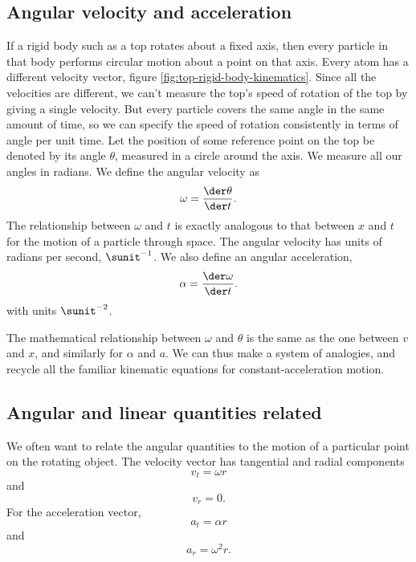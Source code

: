 

\subsection{Angular velocity and acceleration}
If a rigid body such as a top rotates about a fixed axis, then every particle in that body
performs circular motion about a point on that axis.
Every atom has a different velocity
vector, figure \ref{fig:top-rigid-body-kinematics}. Since all the velocities are different, we
can't measure the top's speed of rotation of the top by giving a
single velocity.
But every particle covers the same angle in the same
amount of time, so we can specify the speed of
rotation consistently in terms of angle per unit time. Let
the position of some reference point on the top be denoted
by its angle $\theta$, measured in a circle around the axis. We measure
all our angles in radians.  We define the angular velocity as
\begin{equation*}
        \omega        =          \frac{\der\theta}{\der t} .
\end{equation*}
The relationship between $\omega$ and $t$ is
exactly analogous to that between $x$ and $t$ for the motion of
a particle through space.
The angular velocity has units of radians per second, $\sunit^{-1}$.
We also define an
angular acceleration,
\begin{equation*}
        \alpha        =          \frac{\der\omega}{\der t}.
\end{equation*}
with units $\sunit^{-2}$.

The mathematical relationship between $\omega$ and $\theta$ is the same as
the one between $v$ and $x$, and similarly for $\alpha$ and $a$. We can
thus make a system of analogies, and recycle all
the familiar kinematic equations for constant-acceleration
motion.


\subsection{Angular and linear quantities related}
We often want to relate the angular
quantities to the motion of a particular point on the rotating
object.
The velocity vector has tangential and radial components
\begin{equation*}
        v_t        =  \omega r
\end{equation*}
and
\begin{equation*}
        v_r        =  0.
\end{equation*}
For the acceleration vector,
\begin{equation*}
        a_t        =  \alpha r
\end{equation*}
and
\begin{equation*}
        a_r        =  \omega^2 r.
\end{equation*}
